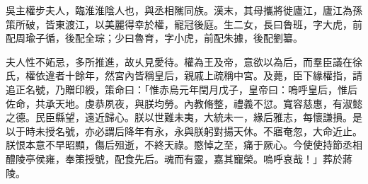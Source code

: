 \begin{pinyinscope}
 
 
 吳主權步夫人，臨淮淮陰人也，與丞相隲同族。漢末，其母攜將徙廬江，廬江為孫策所破，皆東渡江，以美麗得幸於權，寵冠後庭。生二女，長曰魯班，字大虎，前配周瑜子循，後配全琮；少曰魯育，字小虎，前配朱據，後配劉纂。
 
 
 
 
 
 
 夫人性不妬忌，多所推進，故乆見愛待。權為王及帝，意欲以為后，而羣臣議在徐氏，權依違者十餘年，然宮內皆稱皇后，親戚上疏稱中宮。及薨，臣下緣權指，請追正名號，乃贈印綬，策命曰：「惟赤烏元年閏月戊子，皇帝曰：嗚呼皇后，惟后佐命，共承天地。虔恭夙夜，與朕均勞。內教脩整，禮義不愆。寬容慈惠，有淑懿之德。民臣縣望，遠近歸心。朕以世難未夷，大統未一，緣后雅志，每懷謙損。是以于時未授名號，亦必謂后降年有永，永與朕躬對揚天休。不寤奄忽，大命近止。朕恨本意不早昭顯，傷后殂逝，不終天祿。愍悼之至，痛于厥心。今使使持節丞相醴陵亭侯雍，奉策授號，配食先后。魂而有靈，嘉其寵榮。嗚呼哀哉！」葬於蔣陵。
 
 
\end{pinyinscope}